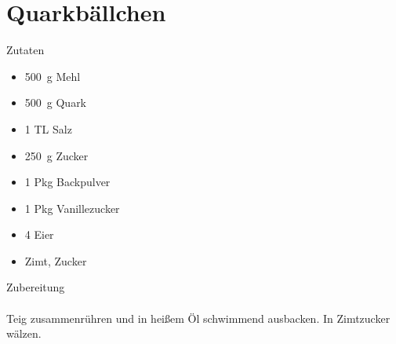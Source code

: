\section*{Quarkbällchen}
\ihead{}\ohead{}
\cfoot{}
{\Large Zutaten}
\begin{multicols}{2}
\begin{itemize}
    \item \SI{500}{g} Mehl
    \item \SI{500}{g} Quark
    \item \num{1} TL Salz
    \item \SI{250}{g} Zucker
    \item \num{1} Pkg Backpulver
    \item \num{1} Pkg Vanillezucker
    \item \num{4} Eier
    \item Zimt, Zucker
\end{itemize}
\end{multicols}
\noindent
{\Large Zubereitung}\\
\\
Teig zusammenrühren und in heißem Öl schwimmend ausbacken. In Zimtzucker wälzen.
